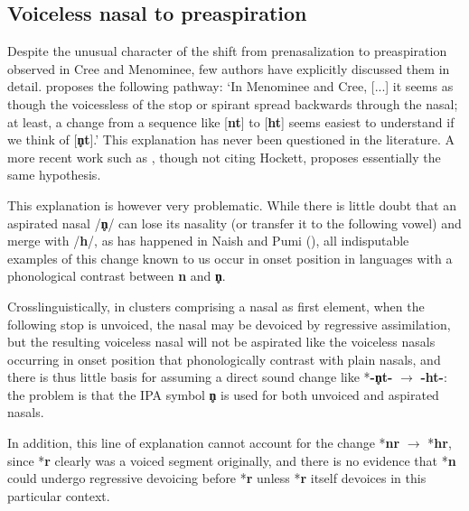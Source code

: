 \documentclass[oneside,a4paper,11pt]{article}
\newcommand{\ipa}[1]{{\phon\mbox{\textbf{#1}}}}
\newcommand{\phonet}[1]{[{\phon\mbox{\textbf{#1}}}]}
\newcommand{\change}[2]{*\ipa{#1} $\rightarrow$ *\ipa{#2}}
\begin{document}
\subsection{Voiceless nasal to preaspiration}
Despite the unusual character of the shift from prenasalization to preaspiration observed in Cree and Menominee, few authors have explicitly discussed them in detail.  \citet[60]{hockett81menominee} proposes the following pathway: `In Menominee and Cree, [...] it seems as though the voicessless of the stop or spirant spread backwards through the nasal; at least, a change from a sequence like \phonet{nt} to \phonet{ht} seems easiest to understand if we think of \phonet{n̥t}.' This explanation has never been questioned in the literature. A more recent work such as \citet[25-6]{clayton10preaspirated}, though not citing Hockett, proposes essentially the same hypothesis.

This explanation is however very problematic. While there is little doubt that an aspirated nasal /\ipa{n̥}/ can lose its nasality (or transfer it to the following vowel) and merge with /\ipa{h}/, as has happened in Naish and Pumi (\citealt{michaud-jacques12nasalite}), all indisputable examples of this change known to us occur in onset position in languages with a phonological contrast between \ipa{n} and \ipa{n̥}.

Crosslinguistically, in clusters comprising a nasal as first element, when the following stop is unvoiced, the nasal may be devoiced by regressive assimilation, but the resulting voiceless nasal will not be aspirated like the voiceless nasals occurring in onset position that phonologically contrast with plain nasals, and there is thus little basis for assuming a direct sound change like *\ipa{-n̥t-} $\rightarrow$ \ipa{-ht-}: the problem is that the IPA symbol \ipa{n̥} is used for both unvoiced and aspirated nasals.


In addition, this line of explanation cannot account for the change \change{nr}{hr}, since *\ipa{r} clearly was a voiced segment originally, and there is no evidence that *\ipa{n} could undergo regressive devoicing before *\ipa{r} unless *\ipa{r} itself devoices in this particular context.
\end{document}
